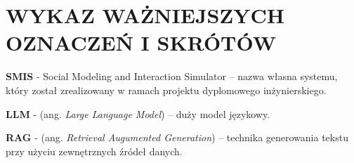\chapter*{WYKAZ WAŻNIEJSZYCH OZNACZEŃ I SKRÓTÓW}

\textbf{SMIS} - Social Modeling and Interaction Simulator -- nazwa własna systemu, który został zrealizowany w ramach projektu dyplomowego inżynierskiego.

\textbf{LLM} - (ang. \textit{Large Language Model}) -- duży model językowy.

\textbf{RAG} - (ang. \textit{Retrieval Augumented Generation}) -- technika generowania tekstu przy użyciu zewnętrznych źródeł danych.
